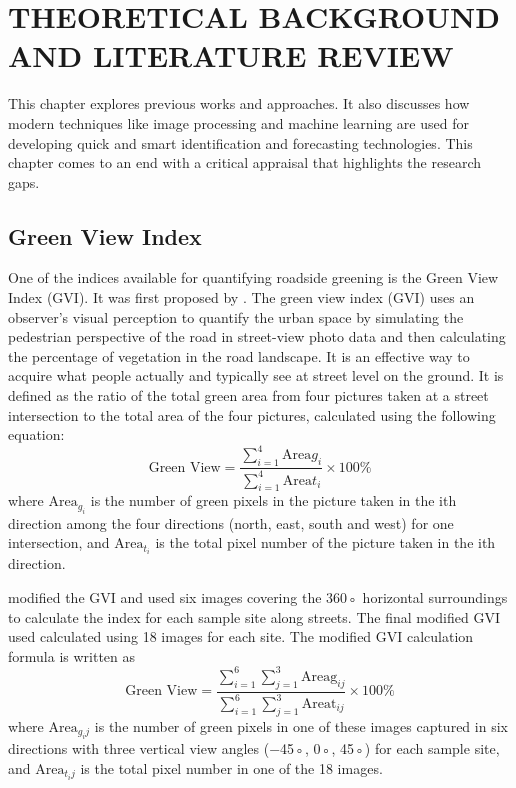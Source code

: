 \chapter{THEORETICAL BACKGROUND AND LITERATURE REVIEW}\label{intro}
\vspace{-3em}
This chapter explores previous works and approaches. It also discusses how modern techniques like image processing and machine learning are used for developing quick and smart identification and forecasting technologies. This chapter comes to an end with a critical appraisal that highlights the research gaps.

\section{Green View Index}


One of the indices available for quantifying roadside greening is the Green View Index (GVI). It was first proposed by . The green view index (GVI) uses an observer's visual perception to quantify the urban space by simulating the pedestrian perspective of the road in street-view photo data and then calculating the percentage of vegetation in the road landscape. It is an effective way to acquire what people actually and typically see at street level on the ground. It is defined as the ratio of
the total green area from four pictures taken at a street intersection
to the total area of the four pictures, calculated using the following
equation:
\begin{equation}
\text{Green View} = \frac{\sum_{i=1}^{4} \text{Area}g_i}{\sum_{i=1}^{4} \text{Area}t_i} \times 100\%
\end{equation}
where $\text{Area}_{g_i}$ is the number of green pixels in the picture taken in
the ith direction among the four directions (north, east, south and
west) for one intersection, and $\text{Area}_{t_i}$ is the total pixel number of
the picture taken in the ith direction.

 modified the GVI and used six images covering
the 360◦ horizontal surroundings to calculate the index for each
sample site along streets. The final modified GVI used calculated using 18 images for each site.
The modified GVI calculation formula is written as
\begin{equation}
\text{Green View} = \frac{\sum_{i=1}^{6} \sum_{j=1}^{3} \text{Areag}_{ij}}{\sum_{i=1}^{6} \sum_{j=1}^{3} \text{Areat}_{ij}} \times 100\%
\end{equation}
where $\text{Area}_{g_ij}$ is the number of green pixels in one of these images
captured in six directions with three vertical view angles (−45◦, 0◦,
45◦) for each sample site, and $\text{Area}_{t_ij}$ is the total pixel number in
one of the 18 images.

